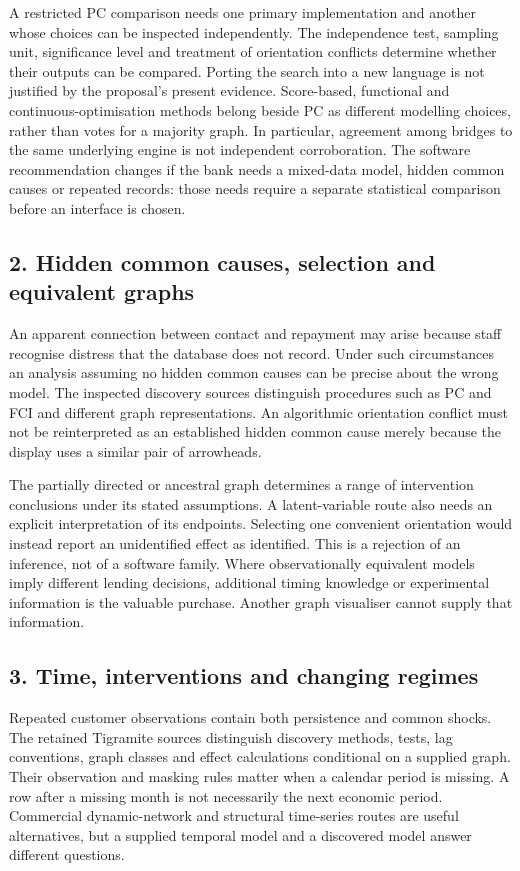 A restricted PC comparison needs one primary implementation and another
whose choices can be inspected independently. The independence test, sampling
unit, significance level and treatment of orientation conflicts determine
whether their outputs can be compared.
Porting the search into a new language is not justified by the proposal's
present evidence. Score-based, functional and continuous-optimisation methods
belong beside PC as different modelling choices, rather than votes for a
majority graph. In particular, agreement among bridges to the same underlying
engine is not independent corroboration. The software recommendation changes
if the bank needs a mixed-data model, hidden common causes or repeated records:
those needs require a separate statistical comparison before an interface is
chosen.

\subsection{2. Hidden common causes, selection and equivalent graphs}
An apparent connection between contact and repayment may arise because staff
recognise distress that the database does not record. Under such circumstances
an analysis assuming no hidden common causes can be precise about the wrong
model. The inspected discovery sources distinguish procedures such as PC and
FCI and different graph representations. An algorithmic orientation conflict
must not be reinterpreted as an established hidden common cause merely because
the display uses a similar pair of arrowheads.
\citep{v12_sw_causallearn,exec13_pcalg_reuse_primary}

The partially directed or ancestral graph determines a range of intervention
conclusions under its stated assumptions. A latent-variable route also needs
an explicit interpretation of its endpoints. Selecting one convenient
orientation would instead report an unidentified effect as identified. This is a rejection of an inference, not of a software
family. Where observationally equivalent models imply different lending
decisions, additional timing knowledge or experimental information is the
valuable purchase. Another graph visualiser cannot supply that information.

\subsection{3. Time, interventions and changing regimes}
Repeated customer observations contain both persistence and common shocks.
The retained Tigramite sources distinguish discovery methods, tests, lag
conventions, graph classes and effect calculations conditional on a supplied
graph. Their observation and masking rules matter when a calendar period is
missing. A row after a missing month is not necessarily the next economic
period. Commercial dynamic-network and structural time-series routes are
useful alternatives, but a supplied temporal model and a discovered model
answer different questions.
\citep{exec23_tigramite_reuse_source,exec13_ct_genie_dbn,exec13_ct_stata_svar}

